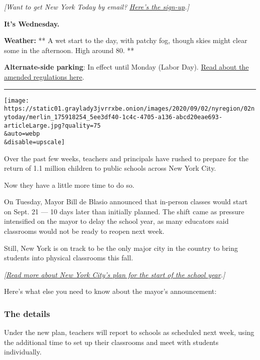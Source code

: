 \emph{{[}Want to get New York Today by email?}
\href{https://www.nytimes3xbfgragh.onion/newsletters/newyorktoday}{\emph{Here's
the sign-up}}\emph{.{]}}

\textbf{It's Wednesday.}

\textbf{Weather:} ** A wet start to the day, with patchy fog, though
skies might clear some in the afternoon. High around 80. **

\textbf{Alternate-side parking}: In effect until Monday (Labor Day).
\href{https://www1.nyc.gov/html/dot/html/motorist/alternate-side-parking.shtml?te=1\&nl=new-york-today\&emc=edit_ur_20200816\#reform}{Read
about the amended regulations here}.

\begin{center}\rule{0.5\linewidth}{\linethickness}\end{center}

\texttt{[image: https://static01.graylady3jvrrxbe.onion/images/2020/09/02/nyregion/02nytoday/merlin\_175918254\_5ee3df40-1c4c-4705-a136-abcd20eae693-articleLarge.jpg?quality=75\\\&auto=webp\\\&disable=upscale]}

Over the past few weeks, teachers and principals have rushed to prepare
for the return of 1.1 million children to public schools across New York
City.

Now they have a little more time to do so.

On Tuesday, Mayor Bill de Blasio announced that in-person classes would
start on Sept. 21 --- 10 days later than initially planned. The shift
came as pressure intensified on the mayor to delay the school year, as
many educators said classrooms would not be ready to reopen next week.

Still, New York is on track to be the only major city in the country to
bring students into physical classrooms this fall.

\emph{{[}}\href{https://www.nytimes3xbfgragh.onion/2020/09/01/nyregion/schools-open-coronavirus-nyc.html}{\emph{Read
more about New York City's plan for the start of the school
year}}\emph{.{]}}

Here's what else you need to know about the mayor's announcement:

\hypertarget{the-details}{%
\subsubsection{The details}\label{the-details}}

Under the new plan, teachers will report to schools as scheduled next
week, using the additional time to set up their classrooms and meet with
students individually.

